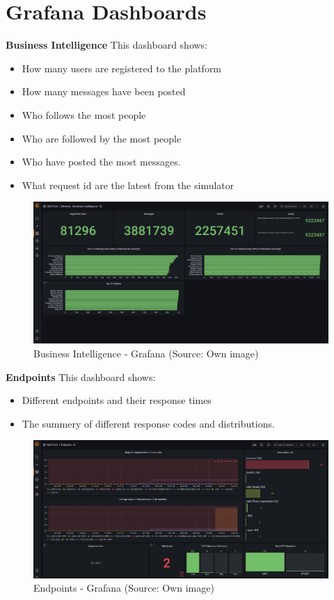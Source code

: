 \section{Grafana Dashboards}\label{app:grafana_dashboards}

\textbf{Business Intelligence}
This dashboard shows:
\begin{itemize}
    \item How many users are registered to the platform
    \item How many messages have been posted
    \item Who follows the most people
    \item Who are followed by the most people
    \item Who have posted the most messages.
    \item What request id are the latest from the simulator
\end{itemize}
\begin{figure}[H]
    \centering
    \includegraphics[width = \linewidth]{images/monitoring/business_intelligence_1.png}
    \caption{Business Intelligence - Grafana (Source: Own image)}
    \label{fig:grafana-dashboard-BusinessIntelligence}
\end{figure}
\newpage
\textbf{Endpoints}
This dashboard shows:
\begin{itemize}
    \item Different endpoints and their response times
    \item The summery of different response codes and distributions.
\end{itemize}
\begin{figure}[H]
    \centering
    \includegraphics[width = \linewidth]{images/monitoring/Grafana-Endpoint.png}
    \caption{Endpoints - Grafana (Source: Own image)}
    \label{fig:grafana-dashboard-Endpoints}
\end{figure}


